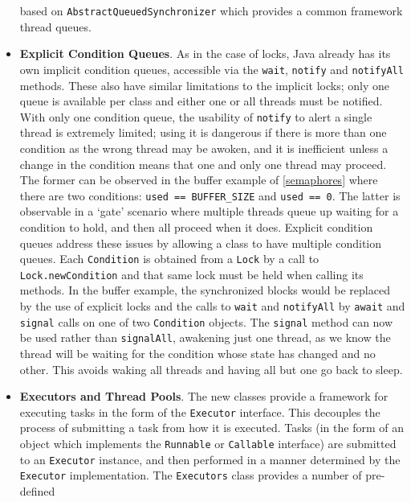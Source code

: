 \begin{itemize}
    based on \texttt{AbstractQueuedSynchronizer}\cite{aqs} which
    provides a common framework thread queues.
    \item \textbf{Explicit Condition Queues}.  As in the case of
      locks, Java already has its own implicit condition queues,
      accessible via the \texttt{wait}, \texttt{notify} and
      \texttt{notifyAll} methods.  These also have similar limitations
      to the implicit locks; only one queue is available per class and
      either one or all threads must be notified.  With only one
      condition queue, the usability of \texttt{notify} to alert a
      single thread is extremely limited; using it is dangerous if
      there is more than one condition as the wrong thread may be
      awoken, and it is inefficient unless a change in the condition
      means that one and only one thread may proceed.  The former can
      be observed in the buffer example of \ref{semaphores} where
      there are two conditions: \texttt{used == BUFFER\_SIZE} and
      \texttt{used == 0}. The latter is observable in a `gate'
      scenario where multiple threads queue up waiting for a condition
      to hold, and then all proceed when it does.  Explicit condition
      queues address these issues by allowing a class to have multiple
      condition queues.  Each \texttt{Condition} is obtained from a
      \texttt{Lock} by a call to \texttt{Lock.newCondition} and that
      same lock must be held when calling its methods.  In the buffer
      example, the synchronized blocks would be replaced by the use of
      explicit locks and the calls to \texttt{wait} and
      \texttt{notifyAll} by \texttt{await} and \texttt{signal} calls
      on one of two \texttt{Condition} objects.  The \texttt{signal}
      method can now be used rather than \texttt{signalAll}, awakening
      just one thread, as we know the thread will be waiting for the
      condition whose state has changed and no other.  This avoids
      waking all threads and having all but one go back to sleep.
    \item \textbf{Executors and Thread Pools}.  The new classes
      provide a framework for executing tasks in the form of the
      \texttt{Executor} interface.  This decouples the process of
      submitting a task from how it is executed.  Tasks (in the form
      of an object which implements the \texttt{Runnable} or
      \texttt{Callable} interface) are submitted to an
      \texttt{Executor} instance, and then performed in a manner
      determined by the \texttt{Executor} implementation.  The
      \texttt{Executors} class provides a number of pre-defined

\end{itemize}
